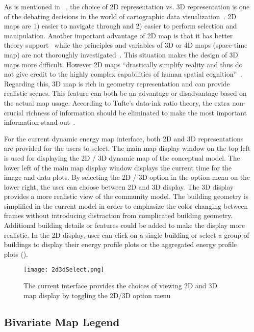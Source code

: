 As is mentioned in ~\cite{Brownrigg2005}, the choice of 2D
representation vs. 3D representation is one of the debating decisions
in the world of cartographic data
visualization~\cite{Brownrigg2005}. 2D maps are 1) easier to navigate
through and 2) easier to perform selection and manipulation. Another
important advantage of 2D map is that it has better theory
support~\cite{Resch2014} while the principles and variables of 3D or
4D maps (space-time map) are not thoroughly
investigated~\cite{Resch2014}. This situation makes the design of 3D
maps more difficult. However 2D maps ``drastically simplify reality
and thus do not give credit to the highly complex capabilities of
human spatial cognition''~\cite{Resch2014}. Regarding this, 3D map is
rich in geometry representation and can provide realistic scenes. This
feature can both be an advantage or disadvantage based on the actual
map usage. According to Tufte's data-ink ratio theory, the extra
non-crucial richness of information should be eliminated to make the
most important information stand out~\cite{Tufte83}.

For the current dynamic energy map interface, both 2D and 3D
representations are provided for the users to select.  The main map
display window on the top left is used for displaying the 2D / 3D
dynamic map of the conceptual model. The lower left of the main map
display window displays the current time for the image and data
plots. By selecting the 2D / 3D option in the option menu on the lower
right, the user can choose between 2D and 3D display. The 3D display
provides a more realistic view of the community model. The building
geometry is simplified in the current model in order to emphasize the
color changing between frames without introducing distraction from
complicated building geometry. Additional building details or features
could be added to make the display more realistic. In the 2D display,
user can click on a single building or select a group of buildings to
display their energy profile plots or the aggregated energy profile
plots ().

\begin{figure}[h!]
  \centering
  \texttt{[image: 2d3dSelect.png]}
  \caption[Map Display of 2D and 3D]{The current interface provides
    the choices of viewing 2D and 3D map display by toggling the 2D/3D
    option menu}
  \label{fig:2d3dSelect}
\end{figure}

\subsection{Bivariate Map Legend} \label{bivariate}

